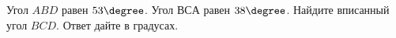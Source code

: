 \begin{ex}
	\begin{condition}
		Угол \( ABD \)  равен \( 53\degree \). Угол \( ВСА \)  равен \( 38\degree \). Найдите вписанный угол \( BCD \). Ответ дайте в градусах.
	\end{condition}
\end{ex}